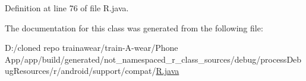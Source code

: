 Definition at line 76 of file R.\+java.



The documentation for this class was generated from the following file\+:\begin{DoxyCompactItemize}
\item 
D\+:/cloned repo trainawear/train-\/\+A-\/wear/\+Phone App/app/build/generated/not\+\_\+namespaced\+\_\+r\+\_\+class\+\_\+sources/debug/process\+Debug\+Resources/r/android/support/compat/\mbox{\hyperlink{process_debug_resources_2r_2android_2support_2compat_2_r_8java}{R.\+java}}\end{DoxyCompactItemize}
